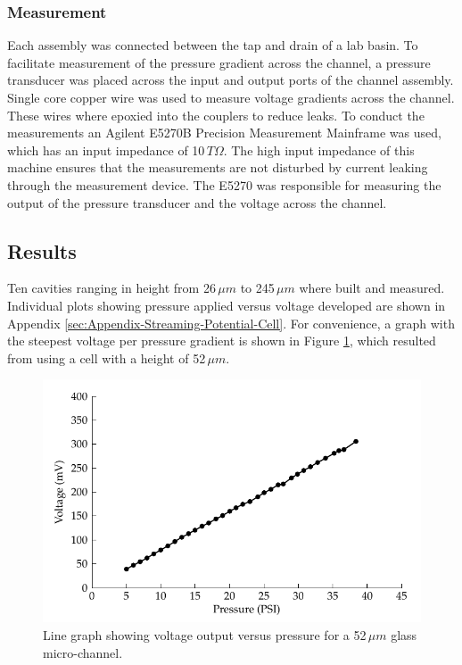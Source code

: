 \subsubsection*{Measurement}

Each assembly was connected between the tap and drain of a lab basin.  To
facilitate measurement of the pressure gradient across the channel, a pressure
transducer was placed across the input and output ports of the channel
assembly. Single core copper wire was used to measure voltage gradients across
the channel. These wires where epoxied into the couplers to reduce leaks. To
conduct the measurements an Agilent E5270B Precision Measurement Mainframe was
used, which has an input impedance of 10${\displaystyle \, T\Omega}$. The high
input impedance of this machine ensures that the measurements are not disturbed
by current leaking through the measurement device. The E5270 was responsible
for measuring the output of the pressure transducer and the voltage across the
channel.


\subsection{Results}

Ten cavities ranging in height from 26$\,\mu m$ to 245$\,\mu m$ where built and
measured. Individual plots showing pressure applied versus voltage developed
are shown in Appendix \ref{sec:Appendix-Streaming-Potential-Cell}.  For
convenience, a graph with the steepest voltage per pressure gradient is shown
in Figure \ref{fig:streamingCell_voltVsPress_52um_convienient}, which resulted
from using a cell with a height of 52$\,\mu m$.

\begin{figure}[H] \centering
    \includegraphics{content/pt1/01-PowerHarvesting/graphics/streamingCell_voltVsPress_52um_out}
    \caption{\label{fig:streamingCell_voltVsPress_52um_convienient}Line graph
        showing voltage output versus pressure for a 52$\,\mu m$ glass
        micro-channel.} \end{figure}


